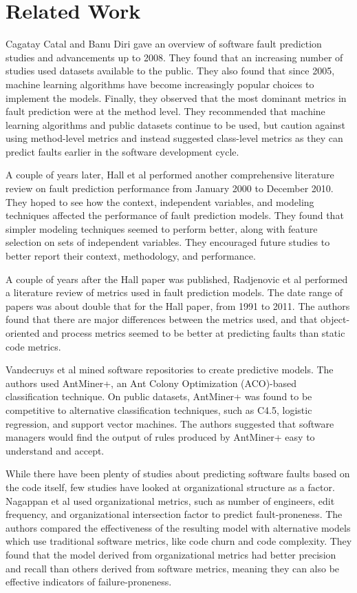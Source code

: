 \documentclass{sig-alternate-05-2015}
\begin{document}
\section{Related Work}
Cagatay Catal and Banu Diri \cite{Catal} gave an overview of software fault prediction studies and advancements up to 2008. They found that an increasing number of studies used datasets available to the public. They also found that since 2005, machine learning algorithms have become increasingly popular choices to implement the models. Finally, they observed that the most dominant metrics in fault prediction were at the method level. They recommended that machine learning algorithms and public datasets continue to be used, but caution against using method-level metrics and instead suggested class-level metrics as they can predict faults earlier in the software development cycle.

A couple of years later, Hall et al \cite{Hall} performed another comprehensive literature review on fault prediction performance from January 2000 to December 2010. They hoped to see how the context, independent variables, and modeling techniques affected the performance of fault prediction models. They found that simpler modeling techniques seemed to perform better, along with feature selection on sets of independent variables. They encouraged future studies to better report their context, methodology, and performance.

A couple of years after the Hall paper was published, Radjenovic et al \cite{Radjenovic} performed a literature review of metrics used in fault prediction models. The date range of papers was about double that for the Hall paper, from 1991 to 2011. The authors found that there are major differences between the metrics used, and that object-oriented and process metrics seemed to be better at predicting faults than static code metrics.

Vandecruys et al \cite{Vandecruys} mined software repositories to create predictive models. The authors used AntMiner+, an Ant Colony Optimization (ACO)-based classification technique. On public datasets, AntMiner+ was found to be competitive to alternative classification techniques, such as C4.5, logistic regression, and support vector machines. The authors suggested that software managers would find the output of rules produced by AntMiner+ easy to understand and accept.

While there have been plenty of studies about predicting software faults based on the code itself, few studies have looked at organizational structure as a factor. Nagappan et al \cite{Nagappan} used organizational metrics, such as number of engineers, edit frequency, and organizational intersection factor to predict fault-proneness. The authors compared the effectiveness of the resulting model with alternative models which use traditional software metrics, like code churn and code complexity. They found that the model derived from organizational metrics had better precision and recall than others derived from software metrics, meaning they can also be effective indicators of failure-proneness.
\end{document}
